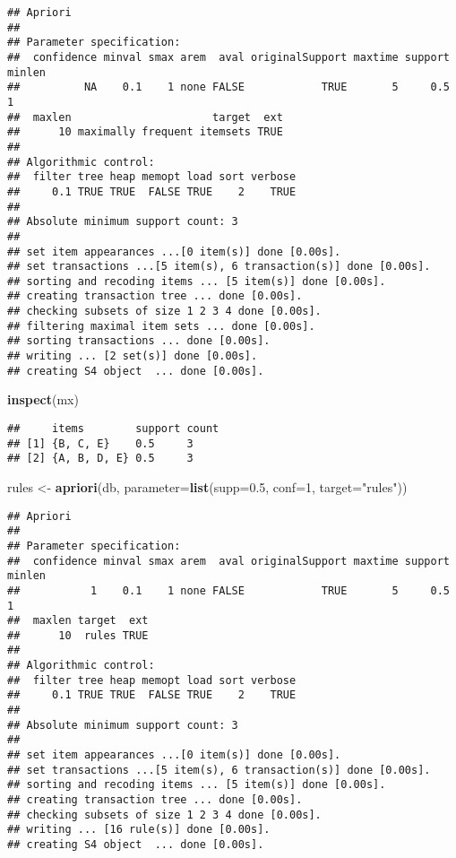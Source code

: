\documentclass[
]{article}
\newenvironment{Shaded}{\begin{snugshade}}{\end{snugshade}}
\newcommand{\AttributeTok}[1]{\textcolor[rgb]{0.13,0.29,0.53}{#1}}
\newcommand{\DecValTok}[1]{\textcolor[rgb]{0.00,0.00,0.81}{#1}}
\newcommand{\FloatTok}[1]{\textcolor[rgb]{0.00,0.00,0.81}{#1}}
\newcommand{\FunctionTok}[1]{\textcolor[rgb]{0.13,0.29,0.53}{\textbf{#1}}}
\newcommand{\NormalTok}[1]{#1}
\newcommand{\OtherTok}[1]{\textcolor[rgb]{0.56,0.35,0.01}{#1}}
\newcommand{\StringTok}[1]{\textcolor[rgb]{0.31,0.60,0.02}{#1}}
\begin{document}
\begin{verbatim}
## Apriori
## 
## Parameter specification:
##  confidence minval smax arem  aval originalSupport maxtime support minlen
##          NA    0.1    1 none FALSE            TRUE       5     0.5      1
##  maxlen                      target  ext
##      10 maximally frequent itemsets TRUE
## 
## Algorithmic control:
##  filter tree heap memopt load sort verbose
##     0.1 TRUE TRUE  FALSE TRUE    2    TRUE
## 
## Absolute minimum support count: 3 
## 
## set item appearances ...[0 item(s)] done [0.00s].
## set transactions ...[5 item(s), 6 transaction(s)] done [0.00s].
## sorting and recoding items ... [5 item(s)] done [0.00s].
## creating transaction tree ... done [0.00s].
## checking subsets of size 1 2 3 4 done [0.00s].
## filtering maximal item sets ... done [0.00s].
## sorting transactions ... done [0.00s].
## writing ... [2 set(s)] done [0.00s].
## creating S4 object  ... done [0.00s].
\end{verbatim}

\begin{Shaded}
\begin{Highlighting}[]
\FunctionTok{inspect}\NormalTok{(mx)}
\end{Highlighting}
\end{Shaded}

\begin{verbatim}
##     items        support count
## [1] {B, C, E}    0.5     3    
## [2] {A, B, D, E} 0.5     3
\end{verbatim}

\begin{Shaded}
\begin{Highlighting}[]
\NormalTok{rules }\OtherTok{\textless{}{-}} \FunctionTok{apriori}\NormalTok{(db, }\AttributeTok{parameter=}\FunctionTok{list}\NormalTok{(}\AttributeTok{supp=}\FloatTok{0.5}\NormalTok{, }\AttributeTok{conf=}\DecValTok{1}\NormalTok{, }\AttributeTok{target=}\StringTok{"rules"}\NormalTok{))}
\end{Highlighting}
\end{Shaded}

\begin{verbatim}
## Apriori
## 
## Parameter specification:
##  confidence minval smax arem  aval originalSupport maxtime support minlen
##           1    0.1    1 none FALSE            TRUE       5     0.5      1
##  maxlen target  ext
##      10  rules TRUE
## 
## Algorithmic control:
##  filter tree heap memopt load sort verbose
##     0.1 TRUE TRUE  FALSE TRUE    2    TRUE
## 
## Absolute minimum support count: 3 
## 
## set item appearances ...[0 item(s)] done [0.00s].
## set transactions ...[5 item(s), 6 transaction(s)] done [0.00s].
## sorting and recoding items ... [5 item(s)] done [0.00s].
## creating transaction tree ... done [0.00s].
## checking subsets of size 1 2 3 4 done [0.00s].
## writing ... [16 rule(s)] done [0.00s].
## creating S4 object  ... done [0.00s].
\end{verbatim}
\end{document}
